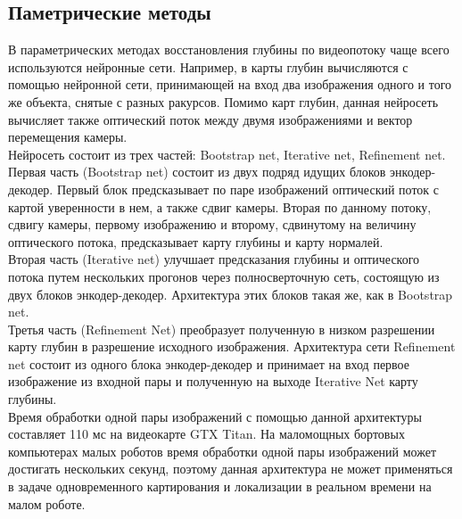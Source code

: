 \documentclass{mipt-thesis-bs}
\begin{document}
\subsection{Паметрические методы}
В параметрических методах восстановления глубины по видеопотоку чаще всего используются нейронные сети. Например, в \cite{ummenhofer2017demon} карты глубин вычисляются с помощью нейронной сети, принимающей на вход два изображения одного и того же объекта, снятые с разных ракурсов. Помимо карт глубин, данная нейросеть вычисляет также оптический поток между двумя изображениями и вектор перемещения камеры.\\
Нейросеть состоит из трех частей: Bootstrap net, Iterative net, Refinement net.\\
Первая часть (Bootstrap net) состоит из двух подряд идущих блоков энкодер-декодер. Первый блок предсказывает по паре изображений оптический поток с картой уверенности в нем, а также сдвиг камеры. Вторая по данному потоку, сдвигу камеры, первому изображению и второму, сдвинутому на величину оптического потока, предсказывает карту глубины и карту нормалей.\\
Вторая часть (Iterative net) улучшает предсказания глубины и оптического потока путем нескольких прогонов через полносверточную сеть, состоящую из двух блоков энкодер-декодер. Архитектура этих блоков такая же, как в Bootstrap net.\\
Третья часть (Refinement Net) преобразует полученную в низком разрешении карту глубин в разрешение исходного изображения. Архитектура сети Refinement net состоит из одного блока энкодер-декодер и принимает на вход первое изображение из входной пары и полученную на выходе Iterative Net карту глубины.\\
Время обработки одной пары изображений с помощью данной архитектуры составляет 110 мс на видеокарте GTX Titan. На маломощных бортовых компьютерах малых роботов время обработки одной пары изображений может достигать нескольких секунд, поэтому данная архитектура не может применяться в задаче одновременного картирования и локализации в реальном времени на малом роботе.\\
\end{document}
